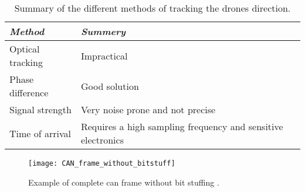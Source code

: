
\begin{table}[h]
	\centering
	\caption{Summary of the different methods of tracking the drones direction.}\label{tab:trackdirectconcl}
	\begin{tabular}{ll}
		\textit{Method} 				& \textit{Summery}  	\\ \toprule \rowcolor{lightGrey}
		Optical tracking				& Impractical \\
		Phase difference 				& Good solution \\ \rowcolor{lightGrey}
		Signal strength 				& Very noise prone and not precise \\
		Time of arrival					& Requires a high sampling frequency and sensitive electronics \\
	\end{tabular}
\end{table}



\begin{figure} [htbp]
	\centering
	\texttt{[image: CAN\_frame\_without\_bitstuff]}
	\caption{Example of complete \gls{can} frame without bit stuffing \citep{CAN-Bus-frame}.}
	\label{fig:frame_wo_bitstuff}
\end{figure}